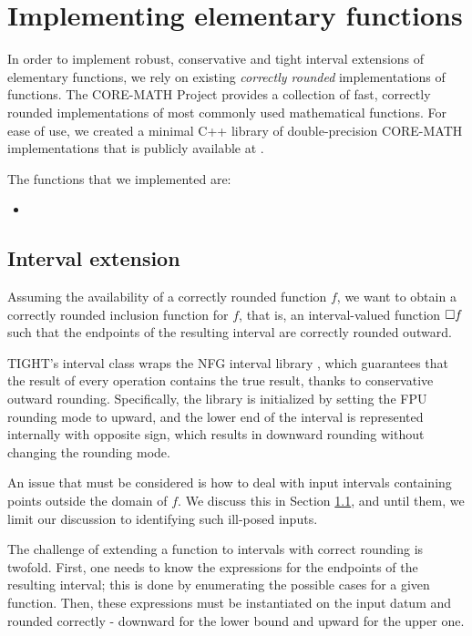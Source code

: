 
\section{Implementing elementary functions}
\label{sec:functions}
In order to implement robust, conservative and tight interval extensions of elementary functions, we rely on existing \emph{correctly rounded} implementations of functions.
The CORE-MATH Project \cite{Sibidanov2022} provides a collection of fast, correctly rounded implementations of most commonly used mathematical functions.
For ease of use, we created a minimal C++ library of double-precision CORE-MATH implementations that is publicly available at \url{}.

The functions that we implemented are:
\begin{itemize}
	\item
\end{itemize}

\subsection{Interval extension}
Assuming the availability of a correctly rounded function $f$, we want to obtain a correctly rounded inclusion function for $f$, that is, an interval-valued function $\Box f$ such that the endpoints of the resulting interval are correctly rounded outward.

TIGHT's interval class wraps the NFG interval library \cite{nfg}, which guarantees that the result of every operation contains the true result, thanks to conservative outward rounding. Specifically, the library is initialized by setting the FPU rounding mode to upward, and the lower end of the interval is represented internally with opposite sign, which results in downward rounding without changing the rounding mode.

An issue that must be considered is how to deal with input intervals containing points outside the domain of $f$. We discuss this in Section \ref{}, and until them, we limit our discussion to identifying such ill-posed inputs.

The challenge of extending a function to intervals with correct rounding is twofold.
First, one needs to know the expressions for the endpoints of the resulting interval; this is done by enumerating the possible cases for a given function.
Then, these expressions must be instantiated on the input datum and rounded correctly - downward for the lower bound and upward for the upper one.

